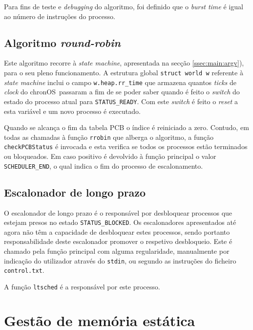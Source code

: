 \documentclass[10pt,oneside]{estiloUBI}
\newcommand{\chronOS}{\textsf{chronOS}}
\begin{document}
	Para fins de teste e \textit{debugging} do algoritmo, foi definido que o \textit{burst time} é igual ao número de instruções do processo.
	
	
	\section{Algoritmo \textit{round-robin}}
	\label{ssec:process:rrobin}
	
	Este algoritmo recorre à \textit{state machine}, apresentada na secção \ref{ssec:main:argv}), para o seu pleno funcionamento. A estrutura global \texttt{struct world w} referente à \textit{state machine} inclui o campo \verb|w.heap.rr_time| que armazena quantos \textit{ticks} de \textit{clock} do \chronOS~passaram a fim de se poder saber quando é feito o \textit{switch} do estado do processo atual para \verb|STATUS_READY|. Com este \textit{switch} é feito o \textit{reset} a esta variável e um novo processo é executado.
	
	Quando se alcança o fim da tabela \ac{PCB} o índice é reiniciado a zero. Contudo, em todas as chamadas à função \verb|rrobin| que alberga o algoritmo, a função \verb|checkPCBStatus| é invocada e esta verifica se todos os processos estão terminados ou bloqueados. Em caso positivo é devolvido à função principal o valor \verb|SCHEDULER_END|, o qual indica o fim do processo de escalonamento.
	
	
	\section{Escalonador de longo prazo}
	\label{ssec:process:longterm}
	
	O escalonador de longo prazo é o responsável por desbloquear processos que estejam presos no estado \verb|STATUS_BLOCKED|. Os escalonadores apresentados até agora não têm a capacidade de desbloquear estes processos, sendo portanto responsabilidade deste escalonador promover o respetivo desbloqueio. Este é chamado pela função principal com alguma regularidade, manualmente por indicação do utilizador através do \verb|stdin|, ou segundo as instruções do ficheiro \verb|control.txt|.
	
	A função \verb|ltsched| é a responsável por este processo.
	
	
	\chapter{Gestão de memória estática}
	\label{sec:memory}
	
\end{document}
